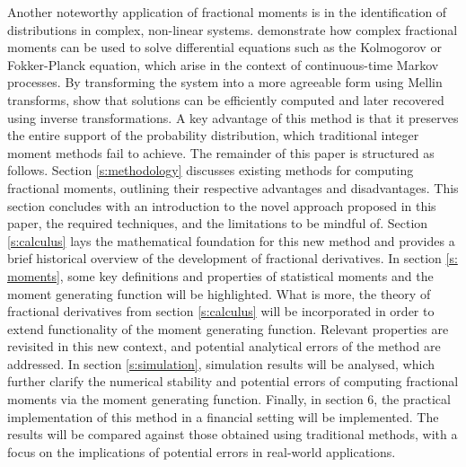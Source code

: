 \newline
Another noteworthy application of fractional moments is in the identification of distributions in complex, non-linear systems. \cite{dimatteo2014} demonstrate how complex fractional moments can be used to solve differential equations such as the Kolmogorov or Fokker-Planck equation, which arise in the context of continuous-time Markov processes.
By transforming the system into a more agreeable form using Mellin transforms, \cite{dimatteo2014} show that solutions can be efficiently computed and later recovered using inverse transformations. A key advantage of this method is that it preserves the entire support of the probability distribution, which traditional integer moment methods fail to achieve.
\newline
The remainder of this paper is structured as follows.
Section \ref{s:methodology} discusses existing methods for computing fractional moments, outlining their respective advantages and disadvantages. This section concludes with an introduction to the novel approach proposed in this paper, the required techniques, and the limitations to be mindful of. Section \ref{s:calculus} lays the mathematical foundation for this new method and provides a brief historical overview of the development of fractional derivatives. In section \ref{s: moments}, some key definitions and properties of statistical moments and the moment generating function will be highlighted. What is more, the theory of fractional derivatives from section \ref{s:calculus} will be incorporated in order to extend functionality of the moment generating function. Relevant properties are revisited in this new context, and potential analytical errors of the method are addressed. In section \ref{s:simulation},  simulation results will be analysed, which further clarify the numerical stability and potential errors of computing fractional moments via the moment generating function. Finally, in section 6, the practical implementation of this method in a financial setting will be implemented. The results will be compared against those obtained using traditional methods, with a focus on the implications of potential errors in real-world applications.